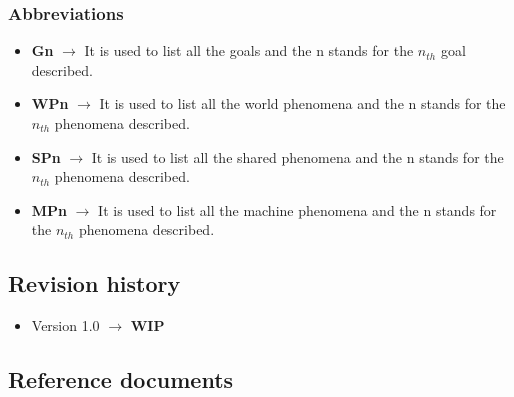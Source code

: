 \documentclass[11pt,twoside]{article}
\begin{document}
		\subsubsection{Abbreviations}
\begin{itemize}
\item \textbf{Gn} $\rightarrow$ It is used to list all the goals and the n stands for the $n_{th}$ goal described.
\item \textbf{WPn} $\rightarrow$ It is used to list all the world phenomena and the n stands for the $n_{th}$ phenomena described.
\item \textbf{SPn} $\rightarrow$ It is used to list all the shared phenomena and the n stands for the $n_{th}$ phenomena described.
\item \textbf{MPn} $\rightarrow$ It is used to list all the machine phenomena and the n stands for the $n_{th}$ phenomena described.
\end{itemize}
		
	\subsection{Revision history}	
\begin{itemize}
\item Version 1.0 $\rightarrow$ \textbf{WIP}
\end{itemize}
	\subsection{Reference documents}
\end{document}

